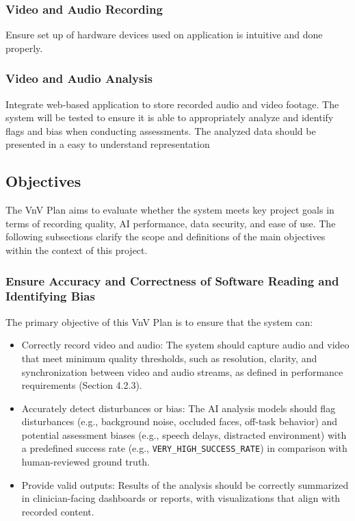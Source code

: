 \documentclass[12pt, titlepage]{article}
\begin{document}
  \subsubsection{Video and Audio Recording}

  Ensure set up of hardware devices used on application is intuitive and done properly. 

  \subsubsection{Video and Audio Analysis}

  Integrate web-based application to store recorded audio and video footage. The system will be tested to ensure it is able to 
  appropriately analyze and identify flags and bias when conducting assessments. The analyzed data should be presented 
  in a easy to understand representation

  \subsection{Objectives}

The VnV Plan aims to evaluate whether the system meets key project goals in terms of recording quality, AI performance, data security, and ease of use. The following subsections clarify the scope and definitions of the main objectives within the context of this project.

\subsubsection{Ensure Accuracy and Correctness of Software Reading and Identifying Bias}
The primary objective of this VnV Plan is to ensure that the system can:
\begin{itemize}
  \item Correctly record video and audio: The system should capture audio and video that meet minimum quality thresholds, such as resolution, clarity, and synchronization between video and audio streams, as defined in performance requirements (Section 4.2.3).
  \item Accurately detect disturbances or bias: The AI analysis models should flag disturbances (e.g., background noise, occluded faces, off-task behavior) and potential assessment biases (e.g., speech delays, distracted environment) with a predefined success rate (e.g., \texttt{VERY\_HIGH\_SUCCESS\_RATE}) in comparison with human-reviewed ground truth.
  \item Provide valid outputs: Results of the analysis should be correctly summarized in clinician-facing dashboards or reports, with visualizations that align with recorded content.
\end{itemize}
\end{document}
